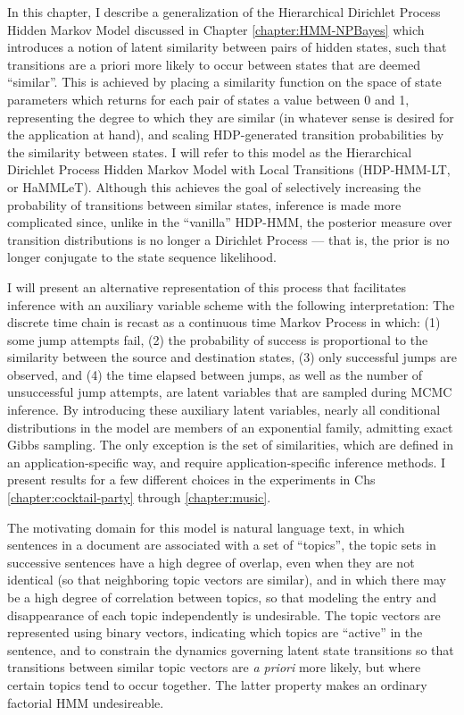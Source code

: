In this chapter, I describe a generalization of the Hierarchical
Dirichlet Process Hidden Markov Model \citet{teh2006hierarchical}
discussed in Chapter \ref{chapter:HMM-NPBayes} which introduces a
notion of latent similarity between pairs of hidden states, such that
transitions are a priori more likely to occur between states that are
deemed ``similar''.  This is achieved by placing a similarity function on
the space of state parameters which returns for each pair of states a
value between 0 and 1, representing the degree to which they are
similar (in whatever sense is desired for the application at hand),
and scaling HDP-generated transition probabilities by the similarity
between states.  I will refer to this model as the Hierarchical
Dirichlet Process Hidden Markov Model with Local Transitions
(HDP-HMM-LT, or HaMMLeT).  Although this achieves the goal of
selectively increasing the probability of transitions between similar
states, inference is made more complicated since, unlike in the
``vanilla'' HDP-HMM, the posterior measure over transition
distributions is no longer a Dirichlet Process --- that is, the prior
is no longer conjugate to the state sequence likelihood.

I will present an alternative representation of this process that
facilitates inference with an auxiliary variable scheme with the
following interpretation: The discrete time chain is recast as a
continuous time Markov Process in which: (1) some jump attempts fail,
(2) the probability of success is proportional to the similarity
between the source and destination states, (3) only successful jumps
are observed, and (4) the time elapsed between jumps, as well as the
number of unsuccessful jump attempts, are latent variables that are
sampled during MCMC inference.  By introducing these auxiliary latent
variables, nearly all conditional distributions in the model are
members of an exponential family, admitting exact Gibbs sampling.  The
only exception is the set of similarities, which are defined in an
application-specific way, and require application-specific inference
methods.  I present results for a few different choices in the
experiments in Chs \ref{chapter:cocktail-party} through
\ref{chapter:music}.

The motivating domain for this model is natural language text, in
which sentences in a document are associated with a set of ``topics'',
the topic sets in successive sentences have a high degree of overlap,
even when they are not identical (so that neighboring topic vectors
are similar), and in which there may be a high degree of correlation
between topics, so that modeling the entry and disappearance of each
topic independently is undesirable.  The topic vectors are represented
using binary vectors, indicating which topics are ``active'' in the
sentence, and to constrain the dynamics governing latent state
transitions so that transitions between similar topic vectors are {\it
a priori} more likely, but where certain topics tend to occur
together.  The latter property makes an ordinary factorial HMM
undesireable.

